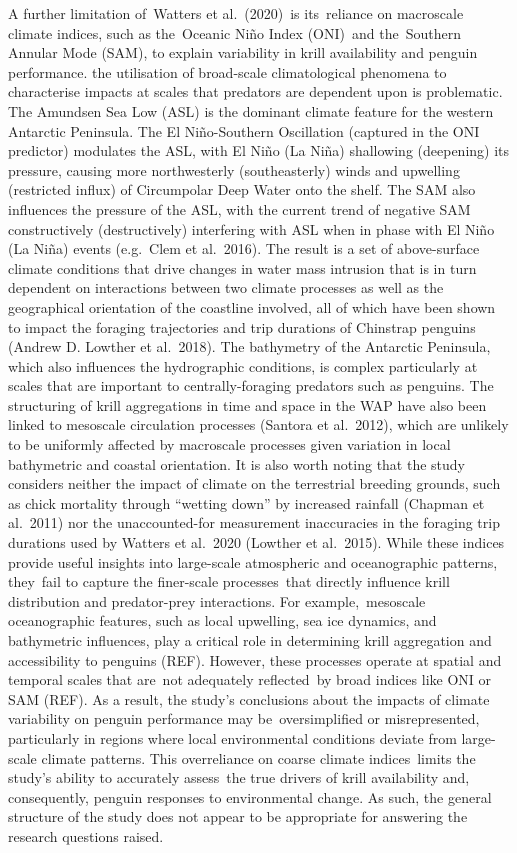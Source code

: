 \documentclass[]{elsarticle} %
\begin{document}
A further limitation of~Watters et al.~(2020)~is its~reliance on
macroscale climate indices, such as the~Oceanic Niño Index (ONI)~and
the~Southern Annular Mode (SAM), to explain variability in krill
availability and penguin performance. the utilisation of broad-scale
climatological phenomena to characterise impacts at scales that
predators are dependent upon is problematic. The Amundsen Sea Low (ASL)
is the dominant climate feature for the western Antarctic Peninsula. The
El Niño-Southern Oscillation (captured in the ONI predictor) modulates
the ASL, with El Niño (La Niña) shallowing (deepening) its pressure,
causing more northwesterly (southeasterly) winds and upwelling
(restricted influx) of Circumpolar Deep Water onto the shelf. The SAM
also influences the pressure of the ASL, with the current trend of
negative SAM constructively (destructively) interfering with ASL when in
phase with El Niño (La Niña) events (e.g.~Clem et al.~2016). The result
is a set of above-surface climate conditions that drive changes in water
mass intrusion that is in turn dependent on interactions between two
climate processes as well as the geographical orientation of the
coastline involved, all of which have been shown to impact the foraging
trajectories and trip durations of Chinstrap penguins (Andrew D. Lowther
et al.~2018). The bathymetry of the Antarctic Peninsula, which also
influences the hydrographic conditions, is complex particularly at
scales that are important to centrally-foraging predators such as
penguins. The structuring of krill aggregations in time and space in the
WAP have also been linked to mesoscale circulation processes (Santora et
al.~2012), which are unlikely to be uniformly affected by macroscale
processes given variation in local bathymetric and coastal orientation.
It is also worth noting that the study considers neither the impact of
climate on the terrestrial breeding grounds, such as chick mortality
through ``wetting down'' by increased rainfall (Chapman et al.~2011) nor
the unaccounted-for measurement inaccuracies in the foraging trip
durations used by Watters et al.~2020 (Lowther et al.~2015). While these
indices provide useful insights into large-scale atmospheric and
oceanographic patterns, they~fail to capture the finer-scale
processes~that directly influence krill distribution and predator-prey
interactions. For example,~mesoscale oceanographic features, such as
local upwelling, sea ice dynamics, and bathymetric influences, play a
critical role in determining krill aggregation and accessibility to
penguins (REF). However, these processes operate at spatial and temporal
scales that are~not adequately reflected~by broad indices like ONI or
SAM (REF). As a result, the study's conclusions about the impacts of
climate variability on penguin performance may be~oversimplified or
misrepresented, particularly in regions where local environmental
conditions deviate from large-scale climate patterns. This overreliance
on coarse climate indices~limits the study's ability to accurately
assess~the true drivers of krill availability and, consequently, penguin
responses to environmental change. As such, the general structure of the
study does not appear to be appropriate for answering the research
questions raised.
\end{document}
